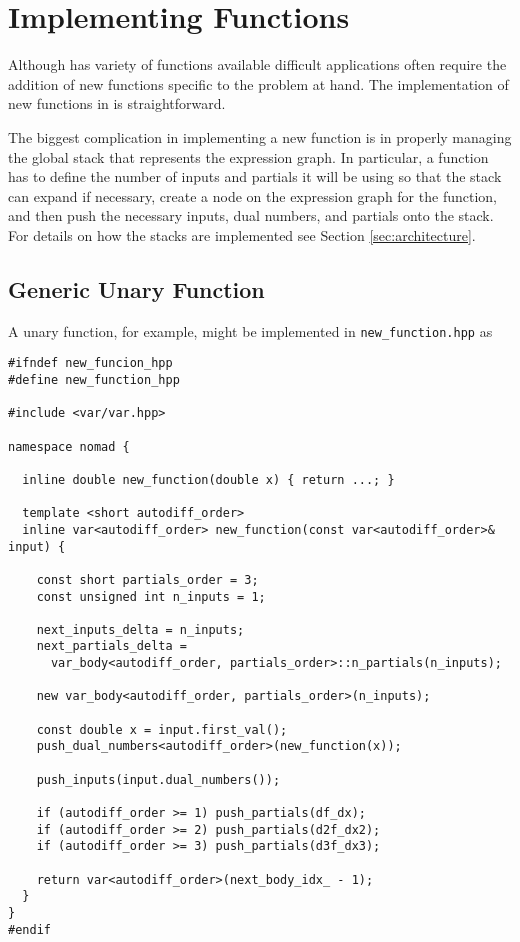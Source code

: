 \section{Implementing Functions}

Although \nomad has variety of functions available difficult applications often
require the addition of new functions specific to the problem at hand.  The
implementation of new functions in \nomad is straightforward.

The biggest complication in implementing a new function is in properly
managing the global stack that represents the expression graph.  In particular,
a function has to define the number of inputs and partials it will be using
so that the stack can expand if necessary, create a node on the expression
graph for the function, and then push the necessary inputs, dual numbers,
and partials onto the stack.  For details on how the stacks are implemented
see Section \ref{sec:architecture}.

\subsection{Generic Unary Function}

A unary function, for example, might be implemented in \verb|new_function.hpp|
as
%
\begin{verbatim}
#ifndef new_funcion_hpp
#define new_function_hpp

#include <var/var.hpp>

namespace nomad {

  inline double new_function(double x) { return ...; }
  
  template <short autodiff_order>
  inline var<autodiff_order> new_function(const var<autodiff_order>& input) {
    
    const short partials_order = 3;
    const unsigned int n_inputs = 1;
    
    next_inputs_delta = n_inputs;
    next_partials_delta =
      var_body<autodiff_order, partials_order>::n_partials(n_inputs);
    
    new var_body<autodiff_order, partials_order>(n_inputs);

    const double x = input.first_val();
    push_dual_numbers<autodiff_order>(new_function(x));
    
    push_inputs(input.dual_numbers());
    
    if (autodiff_order >= 1) push_partials(df_dx);
    if (autodiff_order >= 2) push_partials(d2f_dx2);
    if (autodiff_order >= 3) push_partials(d3f_dx3);

    return var<autodiff_order>(next_body_idx_ - 1);
  }
}
#endif
\end{verbatim}

